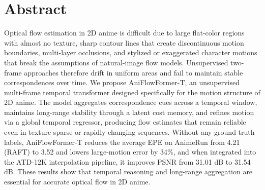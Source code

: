 \chapter*{Abstract}
Optical flow estimation in 2D anime is difficult due to large flat-color regions with almost no texture, sharp contour lines that create discontinuous motion boundaries, multi-layer occlusions, and stylized or exaggerated character motions that break the assumptions of natural-image flow models. Unsupervised two-frame approaches therefore drift in uniform areas and fail to maintain stable correspondences over time. We propose AniFlowFormer-T, an unsupervised multi-frame temporal transformer designed specifically for the motion structure of 2D anime. The model aggregates correspondence cues across a temporal window, maintains long-range stability through a latent cost memory, and refines motion via a global temporal regressor, producing flow estimates that remain reliable even in texture-sparse or rapidly changing sequences. Without any ground-truth labels, AniFlowFormer-T reduces the average EPE on AnimeRun from 4.21 (RAFT) to 3.52 and lowers large-motion error by 34\%, and when integrated into the ATD-12K interpolation pipeline, it improves PSNR from 31.01 dB to 31.54 dB. These results show that temporal reasoning and long-range aggregation are essential for accurate optical flow in 2D anime.
